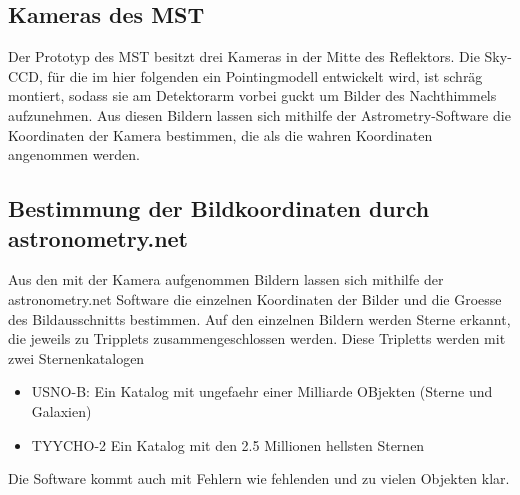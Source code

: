 \subsection{Kameras des MST}
Der Prototyp des MST besitzt drei Kameras in der Mitte des Reflektors. Die Sky-CCD, für die im hier folgenden ein Pointingmodell entwickelt wird, ist schräg montiert, sodass sie am Detektorarm vorbei guckt um Bilder des Nachthimmels aufzunehmen. Aus diesen Bildern lassen sich mithilfe der Astrometry-Software die Koordinaten der Kamera bestimmen, die als die wahren Koordinaten angenommen werden.

\subsection{Bestimmung der Bildkoordinaten durch astronometry.net}
Aus den mit der Kamera aufgenommen Bildern lassen sich mithilfe der astronometry.net Software die einzelnen Koordinaten der Bilder und die Groesse des Bildausschnitts bestimmen. Auf den einzelnen Bildern werden Sterne erkannt, die jeweils zu Tripplets zusammengeschlossen werden. Diese Tripletts werden mit zwei Sternenkatalogen 
\begin{itemize}
\item USNO-B: Ein Katalog mit ungefaehr einer Milliarde OBjekten (Sterne und Galaxien)
\item TYYCHO-2 Ein Katalog mit den 2.5 Millionen hellsten Sternen
\end{itemize}
Die Software kommt auch mit Fehlern wie fehlenden und zu vielen Objekten klar.
